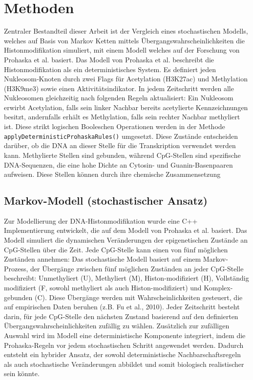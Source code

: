 \documentclass{SeminarV2}
\begin{document}
\section{Methoden}

Zentraler Bestandteil dieser Arbeit ist der Vergleich eines stochastischen Modells, welches auf Basis von Markov Ketten mittels \"{U}bergangswahrscheinlichkeiten die Histonmodifikation simuliert, mit einem Modell welches auf der Forschung von
Prohaska et al. basiert.
Das Modell von Prohaska et al. beschreibt die Histonmodifikation als ein deterministisches System.
Es definiert jeden Nukleosom‑Knoten durch zwei Flags für Acetylation (H3K27ac) und Methylation (H3K9me3) sowie einen Aktivitätsindikator. In jedem Zeitschritt werden alle Nukleosomen gleichzeitig nach folgenden Regeln aktualisiert: Ein Nukleosom erwirbt Acetylation, falls sein linker Nachbar bereits acetylierte Kennzeichnungen besitzt, andernfalls erhält es Methylation, falls sein rechter Nachbar methy­liert ist. Diese strikt logischen Booleschen Operationen werden in der Methode \texttt{applyDeterministicProhaskaRules()} umgesetzt.
Diese Zustände entscheiden darüber, ob die DNA an dieser Stelle für die Transkription verwendet werden kann.
Methylierte Stellen sind gebunden, während 
CpG-Stellen sind spezifische DNA-Sequenzen, die eine hohe Dichte an Cytosin- und Guanin-Basenpaaren aufweisen. 
Diese Stellen können durch ihre chemische Zusammensetzung

\subsection{Markov-Modell (stochastischer Ansatz)}
Zur Modellierung der DNA-Histonmodifikation wurde eine C++ Implementierung entwickelt, die auf dem Modell von Prohaska et al. basiert. Das Modell simuliert die dynamischen Ver\"{a}nderungen der epigenetischen Zust\"{a}nde an CpG-Stellen \"{u}ber die Zeit. Jede CpG-Stelle kann einen von f\"{u}nf m\"{o}glichen Zust\"{a}nden annehmen:
Das stochastische Modell basiert auf einem Markov-Prozess, der Übergänge zwischen fünf möglichen Zuständen an jeder CpG-Stelle beschreibt: Unmethyliert (U), Methyliert (M), Histon-modifiziert (H), Vollständig modifiziert (F, sowohl methyliert als auch Histon-modifiziert) und Komplex-gebunden (C). Diese Übergänge werden mit Wahrscheinlichkeiten gesteuert, die auf empirischen Daten beruhen (z.B. Fu et al., 2010). Jeder Zeitschritt besteht darin, für jede CpG-Stelle den nächsten Zustand basierend auf den definierten Übergangswahrscheinlichkeiten zufällig zu wählen. Zusätzlich zur zufälligen Auswahl wird im Modell eine deterministische Komponente integriert, indem die Prohaska-Regeln vor jedem stochastischen Schritt angewendet werden. Dadurch entsteht ein hybrider Ansatz, der sowohl deterministische Nachbarschaftsregeln als auch stochastische Veränderungen abbildet und somit biologisch realistischer sein könnte.
\end{document}
